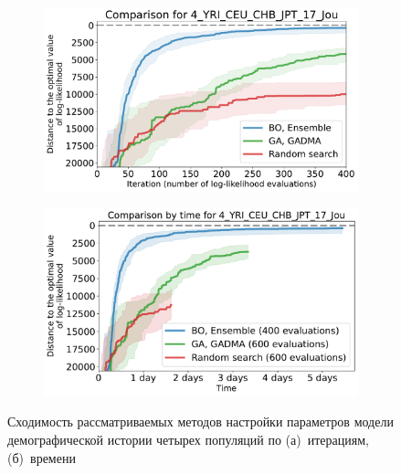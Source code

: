 \begin{figure}[ht]
    \centering
    \begin{subfigure}[b]{0.49\linewidth}
        \centering
        \includegraphics[width=\textwidth]{images_experiments/bo_ga/4_YRI_CEU_CHB_JPT_17_Jou_bo_ga.pdf}
        \caption{}
        \label{fig:bo_ga_comp_4pops:iteration}
    \end{subfigure}%
    \begin{subfigure}[b]{0.49\linewidth}
        \centering
        \includegraphics[width=\textwidth]{images_experiments/bo_ga/4_YRI_CEU_CHB_JPT_17_Jou_bo_ga_time.pdf}
        \caption{}
        \label{fig:bo_ga_comp_4pops:time}
    \end{subfigure}
    \caption{Сходимость рассматриваемых методов настройки параметров модели демографической истории четырех популяций по (а)~итерациям, (б)~времени}
    \label{fig:bo_ga_comp_4pops}
\end{figure}


